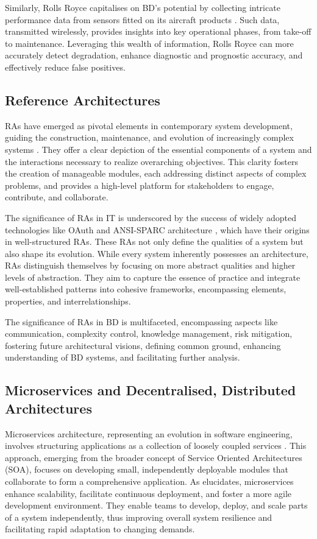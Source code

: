 \documentclass[preprint,12pt]{elsarticle}
\begin{document}
Similarly, Rolls Royce capitalises on BD's potential by collecting intricate performance data from sensors fitted on its aircraft products \cite{Marr2016}. Such data, transmitted wirelessly, provides insights into key operational phases, from take-off to maintenance. Leveraging this wealth of information, Rolls Royce can more accurately detect degradation, enhance diagnostic and prognostic accuracy, and effectively reduce false positives.

\subsection{Reference Architectures}

RAs have emerged as pivotal elements in contemporary system development, guiding the construction, maintenance, and evolution of increasingly complex systems \cite{Cloutier2010}. They offer a clear depiction of the essential components of a system and the interactions necessary to realize overarching objectives. This clarity fosters the creation of manageable modules, each addressing distinct aspects of complex problems, and provides a high-level platform for stakeholders to engage, contribute, and collaborate.

The significance of RAs in IT is underscored by the success of widely adopted technologies like OAuth \cite{OATH} and ANSI-SPARC architecture \cite{ANSI}, which have their origins in well-structured RAs. These RAs not only define the qualities of a system but also shape its evolution. While every system inherently possesses an architecture, RAs distinguish themselves by focusing on more abstract qualities and higher levels of abstraction. They aim to capture the essence of practice and integrate well-established patterns into cohesive frameworks, encompassing elements, properties, and interrelationships.

The significance of RAs in BD is multifaceted, encompassing aspects like communication, complexity control, knowledge management, risk mitigation, fostering future architectural visions, defining common ground, enhancing understanding of BD systems, and facilitating further analysis.

\subsection{Microservices and Decentralised, Distributed Architectures}

Microservices architecture, representing an evolution in software engineering, involves structuring applications as a collection of loosely coupled services \cite{bucchiarone2020microservices}. This approach, emerging from the broader concept of Service Oriented Architectures (SOA), focuses on developing small, independently deployable modules that collaborate to form a comprehensive application. As \citet{Newman2015} elucidates, microservices enhance scalability, facilitate continuous deployment, and foster a more agile development environment. They enable teams to develop, deploy, and scale parts of a system independently, thus improving overall system resilience and facilitating rapid adaptation to changing demands.
\end{document}
